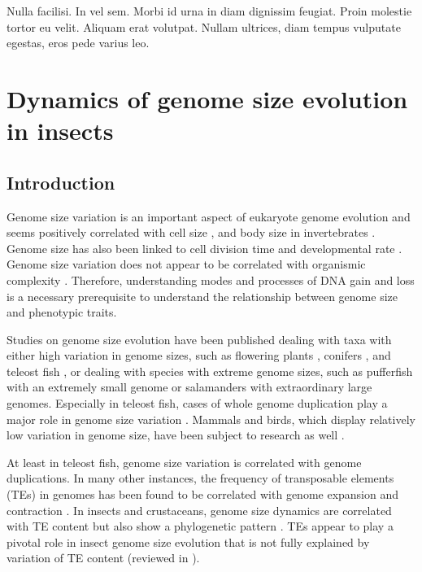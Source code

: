 \begin{savequote}[75mm]
Nulla facilisi. In vel sem. Morbi id urna in diam dignissim feugiat. Proin molestie tortor eu velit. Aliquam erat volutpat. Nullam ultrices, diam tempus vulputate egestas, eros pede varius leo.
\end{savequote}

\chapter{Dynamics of genome size evolution in insects}
\label{cha:dynamics}

\section{Introduction}\label{introduction}

Genome size variation is an important aspect of eukaryote genome
evolution \citep{Gregory2005,Petrov2001} and seems positively correlated
with cell size \citep{Dufresne2011}, and body size in invertebrates
\citep{Gregory2008}. Genome size has also been linked to cell division
time \citep{Bennett1977} and developmental rate \citep{White2000}.
Genome size variation does not appear to be correlated with organismic
complexity \citep{Gregory2007}. Therefore, understanding modes and
processes of DNA gain and loss is a necessary prerequisite to understand
the relationship between genome size and phenotypic traits.

Studies on genome size evolution have been published dealing with taxa
with either high variation in genome sizes, such as flowering plants
\citep{Bennetzen2005,Piegu2006,Vitte2007,Kelly2015}, conifers
\citep{Nystedt2013} \cite{Nystedt2013}, and teleost fish
\citep{Blass2012}, or dealing with species with extreme genome sizes,
such as pufferfish \citep{Neafsey2003} with an extremely small genome or
salamanders \citep{Sun2012} with extraordinary large genomes. Especially
in teleost fish, cases of whole genome duplication play a major role in
genome size variation \citep{Sato2010,Marburger2018}. Mammals and birds,
which display relatively low variation in genome size, have been subject
to research as well \citep{Kapusta2017a}.

At least in teleost fish, genome size variation is correlated with
genome duplications. In many other instances, the frequency of
transposable elements (TEs) in genomes has been found to be correlated
with genome expansion and contraction \citep{Sotero-Caio2017}. In insects
and crustaceans, genome size dynamics are correlated with TE content but
also show a phylogenetic pattern \citep{Alfsnes2017,Petrov1996,Petrov2000}. TEs appear to play
a pivotal role in insect genome size evolution that is not fully
explained by variation of TE content (reviewed in \citet{Maumus2015}).

